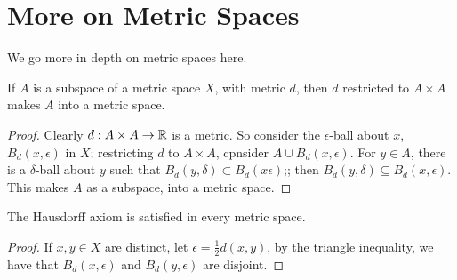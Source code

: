 
\section{More on Metric Spaces}

We go more in depth on metric spaces here.

\begin{theorem}\label{2.3.1}
    If $A$ is a subspace of a metric space $X$, with metric  $d$, then  $d$ restricted to  $A \times
    A$ makes  $A$ into a metric space.
\end{theorem}
\begin{proof}
    Clearly $d:A \times A \rightarrow \mathbb{R}$ is a metric. So consider the $\epsilon$-ball about $x$,
    $B_d(x,\epsilon)$ in $X$; restricting  $d$ to  $A \times A$, cpnsider  $A \cup B_d(x,\epsilon)$.
    For $y \in A$, there is a  $\delta$-ball about  $y$ such that  $B_d(y,\delta) \subset
    B_d(x\epsilon)$;; then $B_d(y,\delta) \subseteq B_d(x,\epsilon)$. This makes $A$ as a subspace,
    into a metric space.
\end{proof}

\begin{theorem}\label{2.3.2}
    The Hausdorff axiom is satisfied in every metric space.
\end{theorem}
\begin{proof}
    If $x,y \in X$ are distinct, let  $\epsilon=\frac{1}{2}d(x,y)$, by the triangle inequality, we
    have that $B_d(x,\epsilon)$ and $B_d(y,\epsilon)$ are disjoint.
\end{proof}

